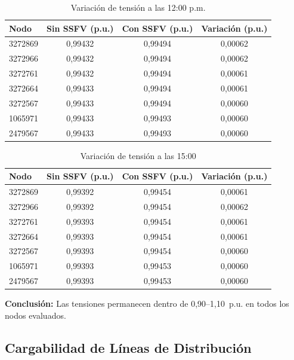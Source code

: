 \begin{table}[H]
    \centering
    \caption{Variación de tensión a las 12:00 p.m.}
    \begin{tabular}{lccc}
    \toprule
    \textbf{Nodo} & \textbf{Sin SSFV (p.u.)} & \textbf{Con SSFV (p.u.)} & \textbf{Variación (p.u.)} \\
    \midrule
    3272869 & 0,99432 & 0,99494 & 0,00062 \\
    3272966 & 0,99432 & 0,99494 & 0,00062 \\
    3272761 & 0,99432 & 0,99494 & 0,00061 \\
    3272664 & 0,99433 & 0,99494 & 0,00061 \\
    3272567 & 0,99433 & 0,99494 & 0,00060 \\
    1065971 & 0,99433 & 0,99493 & 0,00060 \\
    2479567 & 0,99433 & 0,99493 & 0,00060 \\
    \bottomrule
    \end{tabular}
\end{table}

\begin{table}[H]
    \centering
    \caption{Variación de tensión a las 15:00}
    \begin{tabular}{lccc}
    \toprule
    \textbf{Nodo} & \textbf{Sin SSFV (p.u.)} & \textbf{Con SSFV (p.u.)} & \textbf{Variación (p.u.)} \\
    \midrule
    3272869 & 0,99392 & 0,99454 & 0,00061 \\
    3272966 & 0,99392 & 0,99454 & 0,00062 \\
    3272761 & 0,99393 & 0,99454 & 0,00061 \\
    3272664 & 0,99393 & 0,99454 & 0,00061 \\
    3272567 & 0,99393 & 0,99454 & 0,00060 \\
    1065971 & 0,99393 & 0,99453 & 0,00060 \\
    2479567 & 0,99393 & 0,99453 & 0,00060 \\
    \bottomrule
    \end{tabular}
\end{table}

\textbf{Conclusión:} Las tensiones permanecen dentro de 0,90--1,10~p.u. en todos los nodos evaluados.

\subsection{Cargabilidad de Líneas de Distribución}

